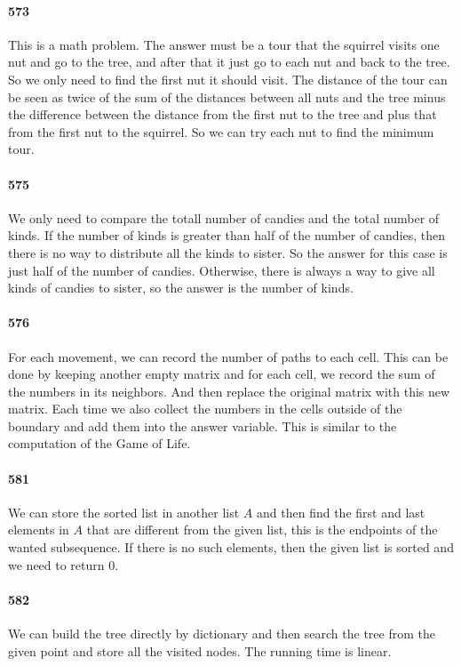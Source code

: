 \documentclass[11pt]{article}
\begin{document}
\begin{itemize}
\paragraph{573}
This is a math problem. The answer must be a tour that the squirrel visits one nut and go to the tree, and after that it just 
go to each nut and back to the tree. So we only need to find the first nut it should visit. The distance of the tour can be 
seen as twice of the sum of the distances between all nuts and the tree minus the difference between the distance from the first nut to the tree and plus that from the first nut to the squirrel. So we can try each nut to find the minimum tour.



\paragraph{575}
We only need to compare the totall number of candies and the total number of kinds. If the number of kinds is greater than 
half of the number of candies, then there is no way to distribute all the kinds to sister. So the answer for this case is 
just half of the number of candies. Otherwise, there is always a way to give all kinds of candies to sister, so the answer is
the number of kinds.

\paragraph{576}
For each movement, we can record the number of paths to each cell. This can be done by keeping another empty matrix and 
for each cell, we record the sum of the numbers in its neighbors. And then replace the original matrix with this new matrix.
Each time we also collect the numbers in the cells outside of the 
boundary and add them into the answer variable. This is similar to the computation of the Game of Life.

\paragraph{581}
We can store the sorted list in another list $A$ and then find the first and last elements in $A$ that are different from the 
given list, this is the endpoints of the wanted subsequence. If there is no such elements, then the given list is sorted and 
we need to return 0.

\paragraph{582}
We can build the tree directly by dictionary and then search the tree from the given point and store all the visited nodes.
The running time is linear.


\end{itemize}
\end{document}
